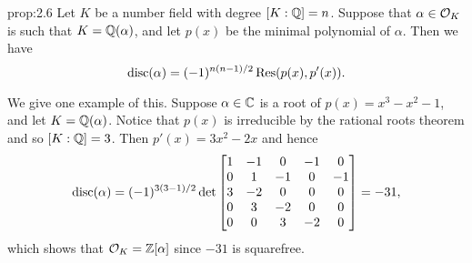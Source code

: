 \begin{prop}{prop:2.6}
    Let $K$ be a number field with degree $[K : \mathbb{Q}] = n$. Suppose that 
    $\alpha \in {\cal O}_K$ is such that $K = \mathbb{Q}(\alpha)$, and let 
    $p(x)$ be the minimal polynomial of $\alpha$. Then we have 
    \[ \operatorname{disc}(\alpha) = (-1)^{n(n-1)/2} \operatorname{Res}(p(x), p'(x)). \]
\end{prop}

We give one example of this. Suppose $\alpha \in \mathbb{C}$ is a root of 
$p(x) = x^3 - x^2 - 1$, and let $K = \mathbb{Q}(\alpha)$. Notice that $p(x)$ is 
irreducible by the rational roots theorem and so $[K : \mathbb{Q}] = 3$. 
Then $p'(x) = 3x^2 - 2x$ and hence 
\[ \operatorname{disc}(\alpha) = (-1)^{3(3-1)/2} \det \begin{bmatrix} 
    1 & -1 & 0 & -1 & 0 \\ 
    0 & 1 & -1 & 0 & -1 \\
    3 & -2 & 0 & 0 & 0 \\ 
    0 & 3 & -2 & 0 & 0 \\ 
    0 & 0 & 3 & -2 & 0
\end{bmatrix} = -31, \] 
which shows that ${\cal O}_K = \mathbb{Z}[\alpha]$ since $-31$ is squarefree.